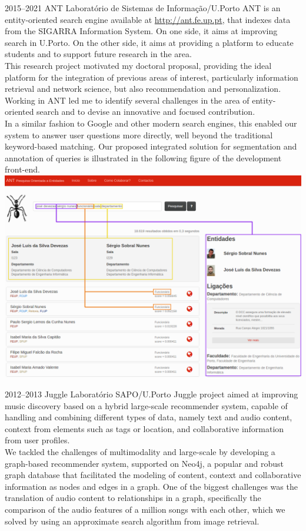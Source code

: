 \documentclass{friggeri-cv}
\begin{document}
\begin{entrylist}
\entry
{2015--2021}
{ANT}
{Laboratório de Sistemas de Informação/U.Porto}
{ANT is an entity-oriented search engine available at \url{http://ant.fe.up.pt}, that indexes data from the SIGARRA Information System. On one side, it aims at improving search in U.Porto. On the other side, it aims at providing a platform to educate students and to support future research in the area.\\

This research project motivated my doctoral proposal, providing the ideal platform for the integration of previous areas of interest, particularly information retrieval and network science, but also recommendation and personalization. Working in ANT led me to identify several challenges in the area of entity-oriented search and to devise an innovative and focused contribution.\\

In a similar fashion to Google and other modern search engines, this enabled our system to answer user questions more directly, well beyond the traditional keyword-based matching. Our proposed integrated solution for segmentation and annotation of queries is illustrated in the following figure of the development front-end.\\

\includegraphics[width=.85\columnwidth]{ant.png}\\}

\entry
{2012--2013}
{Juggle}
{Laboratório SAPO/U.Porto}
{Juggle project aimed at improving music discovery based on a hybrid large-scale recommender system, capable of handling and combining different types of data, namely text and audio content, context from elements such as tags or location, and collaborative information from user profiles.\\

We tackled the challenges of multimodality and large-scale by developing a graph-based recommender system, supported on Neo4j, a popular and robust graph database that facilitated the modeling of content, context and collaborative information as nodes and edges in a graph. One of the biggest challenges was the translation of audio content to relationships in a graph, specifically the comparison of the audio features of a million songs with each other, which we solved by using an approximate search algorithm from image retrieval.}
\end{entrylist}
\end{document}
